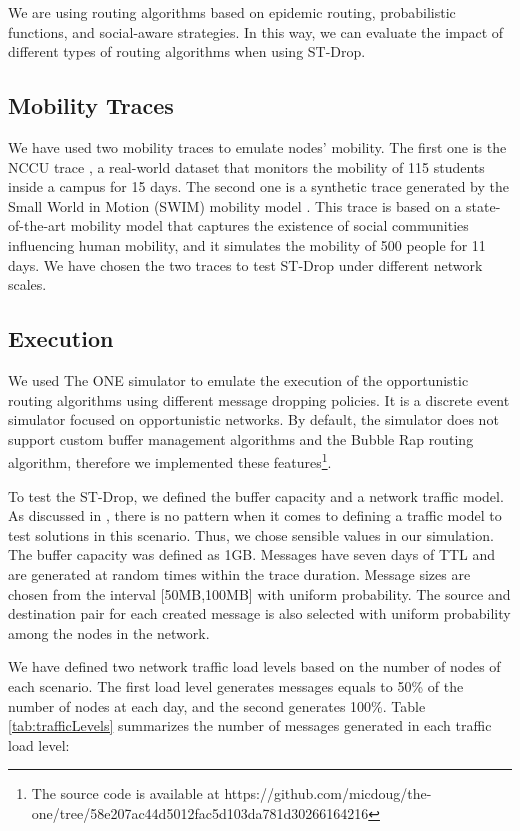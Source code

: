 We are using routing algorithms based on epidemic routing, probabilistic functions, and social-aware strategies. In this way, we can evaluate the impact of different types of routing algorithms when using ST-Drop.

\subsection{Mobility Traces}
\label{sec:datasets}

We have used two mobility traces to emulate nodes' mobility. The first one is the NCCU trace \citep{tsai2015nccu}, a real-world dataset that monitors the mobility of 115 students inside a campus for 15 days. The second one is a synthetic trace generated by the Small World in Motion (SWIM) mobility model \citep{swim-secon10}. This trace is based on a state-of-the-art mobility model that captures the existence of social communities influencing human mobility, and it simulates the mobility of 500 people for 11 days. We have chosen the two traces to test ST-Drop
under different network scales.

\subsection{Execution}
\label{sec:simulation}

We used The ONE simulator \citep{keranen2009one} to emulate the execution of the opportunistic routing algorithms using different message dropping policies. It is a discrete event simulator focused on opportunistic networks. By default, the simulator does not support custom buffer management algorithms and the Bubble Rap routing algorithm, therefore we implemented these features\footnote{The source code is available at https://github.com/micdoug/the-one/tree/58e207ac44d5012fac5d103da781d30266164216}.

To test the ST-Drop, we defined the buffer capacity and a network traffic model. As discussed in \citep{grasic2012analysis}, there is no pattern when it comes to defining a traffic model to test solutions in this scenario. Thus, we chose sensible values in our simulation. The buffer capacity was defined as 1GB. Messages have seven days of TTL and are generated
at random times within the trace duration. Message sizes are chosen from the interval [50MB,100MB] with uniform probability. The source and destination pair for each created message is also selected with uniform probability among the nodes in the network.

We have defined two network traffic load levels based on the number of nodes of each scenario. The first load level generates messages equals to 50\% of the number of nodes at each day, and the second generates 100\%. Table \ref{tab:trafficLevels} summarizes the number of messages generated in each traffic load level:

